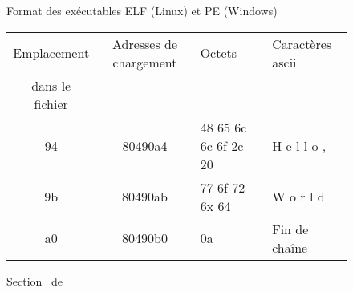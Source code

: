 \begin{figure}[h]
\begin{center}
\end{center}
\caption{Format des exécutables ELF (Linux) et PE (Windows)}
\label{fig:structure_exe}
\end{figure}


\begin{figure}[h]
\begin{center}
\begin{tabular}{|c|c|l|l|}
\hline
Emplacement & Adresses de chargement & Octets & Caractères ascii \\
dans le fichier & &  & \\
\hline
94 & 80490a4 & 48 65 6c 6c 6f 2c 20 & H e l l o ,   \\
9b & 80490ab & 77 6f 72 6x 64 & W o r l d \\
a0 & 80490b0 & 0a & Fin de chaîne       \\
\hline
\end{tabular}
\end{center}
\caption{Section \pdata\ de \helloworld}
\label{fig:data_helloworld}
\end{figure}


